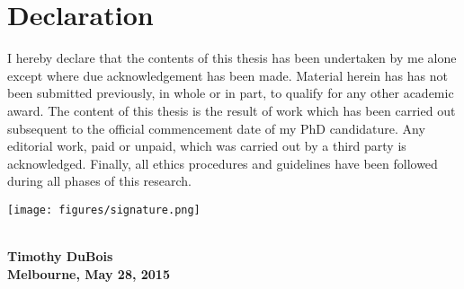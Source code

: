 \chapter{Declaration}
\vspace{3cm}
I hereby declare that the contents of this thesis has been undertaken by me alone except where due acknowledgement has been made.
Material herein has has not been submitted previously, in whole or in part, to qualify for any other academic award.
The content of this thesis is the result of work which has been carried out subsequent to the official commencement date of my PhD candidature.
Any editorial work, paid or unpaid, which was carried out by a third party is acknowledged. Finally, all ethics procedures and guidelines have been followed during all phases of this research.

\vspace{2cm}
\hspace{1.8cm}\texttt{[image: figures/signature.png]}

\vspace{-0.35cm}
\parbox[b][2cm][t]{7cm}{\centering
    \dotfill\\
    {\textbf{Timothy DuBois}} \\
    \textbf{Melbourne, May 28, 2015}
} 